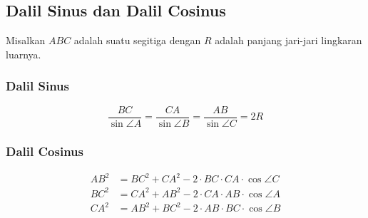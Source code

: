 \subsection{Dalil Sinus dan Dalil Cosinus}
    Misalkan $ABC$ adalah suatu segitiga dengan $R$ adalah panjang jari-jari lingkaran luarnya.
\begin{center}
\end{center}
    \subsubsection{Dalil Sinus}
    $$\dfrac{BC}{\sin \angle A} = \dfrac{CA}{\sin \angle B}= \dfrac{AB}{\sin \angle C} = 2R$$
    
    \subsubsection{Dalil Cosinus}
    \begin{align*}
        AB^2 &= BC^2 + CA^2 - 2\cdot BC \cdot CA \cdot \cos \angle C\\
        BC^2 &= CA^2 + AB^2 - 2\cdot CA \cdot AB \cdot \cos \angle A\\
        CA^2 &= AB^2 + BC^2 - 2\cdot AB \cdot BC \cdot \cos \angle B
    \end{align*}